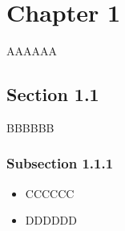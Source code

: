 \chapter{Chapter 1}

AAAAAA

\section{Section 1.1}

BBBBBB

\subsection{Subsection 1.1.1}

\begin{itemize}
    \item CCCCCC
    \item DDDDDD
\end{itemize}